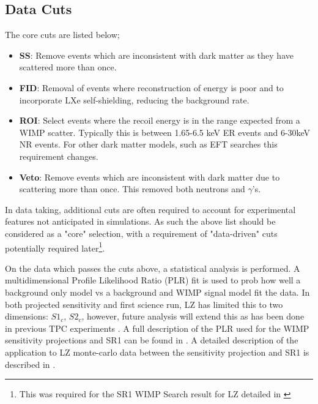 \par
\subsection{Data Cuts}
\par
The core cuts are listed below;
\begin{itemize}
    \item \textbf{SS}: Remove events which are inconsistent with dark matter as they have scattered more than once.
    \item \textbf{FID}: Removal of events where reconstruction of energy is poor and to incorporate LXe self-shielding, reducing the background rate.
    \item \textbf{ROI}: Select events where the recoil energy is in the range expected from a WIMP scatter. Typically this is between 1.65-6.5 keV ER events and 6-30keV NR events. For other dark matter models, such as EFT searches this requirement changes.
    \item \textbf{Veto}: Remove events which are inconsistent with dark matter due to scattering more than once. This removed both neutrons and $\gamma$'s.
\end{itemize}
In data taking, additional cuts are often required to account for experimental features not anticipated in simulations.
As such the above list should be considered as a "core" selection, with a requirement of "data-driven" cuts potentially required later\footnote{This was required for the SR1 WIMP Search result for LZ detailed in \cite{lz_ws_sr1_ref}}.

\par
On the data which passes the cuts above, a statistical analysis is performed.
A multidimensional Profile Likelihood Ratio (PLR) fit is used to prob how well a background only model vs a background and WIMP signal model fit the data.
In both projected sensitivity and first science run, LZ has limited this to two dimensions: {$S1_c$, $S2_c$}, however, future analysis will extend this as has been done in previous TPC experiments \cite{LUX_RUN1_EFT_2021,LUX_RUN4_EFT_2021,shaunalsum_thesis_ref}.
A full description of the PLR used for the WIMP sensitivity projections and SR1 can be found in \cite{LZ_Ibles_LZStats_Thesis_ref}. 
A detailed description of the application to LZ monte-carlo data between the sensitivity projection and SR1 is described in \cite{jonathannikoleyczik_thesis_ref}.
